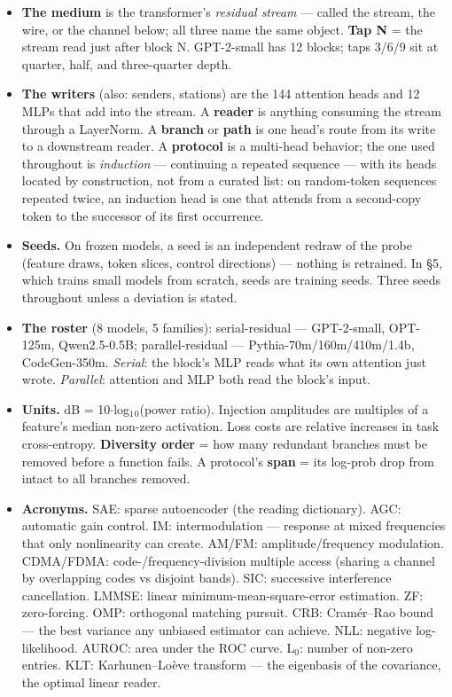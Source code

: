 \documentclass[10pt]{article}
\begin{document}
\begin{itemize}\setlength\itemsep{1pt}
\item \textbf{The medium} is the transformer's \emph{residual stream} --- called the stream, the wire, or the channel below; all three name the same object. \textbf{Tap N} = the stream read just after block N. GPT-2-small has 12 blocks; taps 3/6/9 sit at quarter, half, and three-quarter depth.
\item \textbf{The writers} (also: senders, stations) are the 144 attention heads and 12 MLPs that add into the stream. A \textbf{reader} is anything consuming the stream through a LayerNorm. A \textbf{branch} or \textbf{path} is one head's route from its write to a downstream reader. A \textbf{protocol} is a multi-head behavior; the one used throughout is \emph{induction} --- continuing a repeated sequence --- with its heads located by construction, not from a curated list: on random-token sequences repeated twice, an induction head is one that attends from a second-copy token to the successor of its first occurrence.
\item \textbf{Seeds.} On frozen models, a seed is an independent redraw of the probe (feature draws, token slices, control directions) --- nothing is retrained. In §5, which trains small models from scratch, seeds are training seeds. Three seeds throughout unless a deviation is stated.
\item \textbf{The roster} (8 models, 5 families): serial-residual --- GPT-2-small, OPT-125m, Qwen2.5-0.5B; parallel-residual --- Pythia-70m/160m/410m/1.4b, CodeGen-350m. \emph{Serial}: the block's MLP reads what its own attention just wrote. \emph{Parallel}: attention and MLP both read the block's input.
\item \textbf{Units.} dB = 10$\cdot$log$_{1}$$_{0}$(power ratio). Injection amplitudes are multiples of a feature's median non-zero activation. Loss costs are relative increases in task cross-entropy. \textbf{Diversity order} = how many redundant branches must be removed before a function fails. A protocol's \textbf{span} = its log-prob drop from intact to all branches removed.
\item \textbf{Acronyms.} SAE: sparse autoencoder (the reading dictionary). AGC: automatic gain control. IM: intermodulation --- response at mixed frequencies that only nonlinearity can create. AM/FM: amplitude/frequency modulation. CDMA/FDMA: code-/frequency-division multiple access (sharing a channel by overlapping codes vs disjoint bands). SIC: successive interference cancellation. LMMSE: linear minimum-mean-square-error estimation. ZF: zero-forcing. OMP: orthogonal matching pursuit. CRB: Cramér--Rao bound --- the best variance any unbiased estimator can achieve. NLL: negative log-likelihood. AUROC: area under the ROC curve. L$_{0}$: number of non-zero entries. KLT: Karhunen--Loève transform --- the eigenbasis of the covariance, the optimal linear reader.
\end{itemize}
\end{document}
